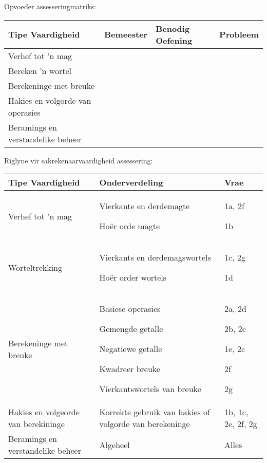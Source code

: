 Opvoeder assesseringmatriks:
\begin{table}[H]
 \begin{center}
  \begin{tabular}{|p{4.5cm}|p{1.5cm}|p{3cm}|p{1.5cm}|} \hline

\textbf{Tipe Vaardigheid} & \textbf{Bemeester} & \textbf{Benodig Oefening} & \textbf{Probleem}   \\ \hline
Verhef tot 'n mag &&&\\ \hline
Bereken 'n wortel &&&\\ \hline
Berekeninge met breuke &&&\\ \hline
Hakies en volgorde van operasies &&&\\ \hline
Beramings en verstandelike beheer &&&\\ \hline
   
  \end{tabular}

 \end{center}

\end{table}
Riglyne vir sakrekenaarvaardigheid assessering:
\begin{table}[H]
 \begin{center}
  \begin{tabular}{|p{5cm}|p{4cm}|p{3cm}|} \hline

\textbf{Tipe Vaardigheid} & \textbf{Onderverdeling} & \textbf{Vrae}   \\ \hline
Verhef tot 'n mag & Vierkante en derdemagte\par Hoër orde magte&1a, 2f \par1b \\ \hline
Worteltrekking& Vierkants en derdemagswortels \par Ho\"{e}r order wortels & 1c, 2g \par 1d\\ \hline
Berekeninge met breuke & Basiese operasies \par Gemengde getalle \par Negatiewe getalle \par Kwadreer breuke \par Vierkantswortels van breuke &2a,  2d\par
2b, 2c\par
1e, 2c\par
2f\par
2g
\\ \hline
Hakies en volgeorde van berekininge&Korrekte gebruik van hakies of volgorde van berekeninge&1b, 1c, 2e, 2f, 2g\\ \hline
Beramings en verstandelike beheer &Algeheel&Alles\\ \hline
   
  \end{tabular}

 \end{center}

\end{table}

